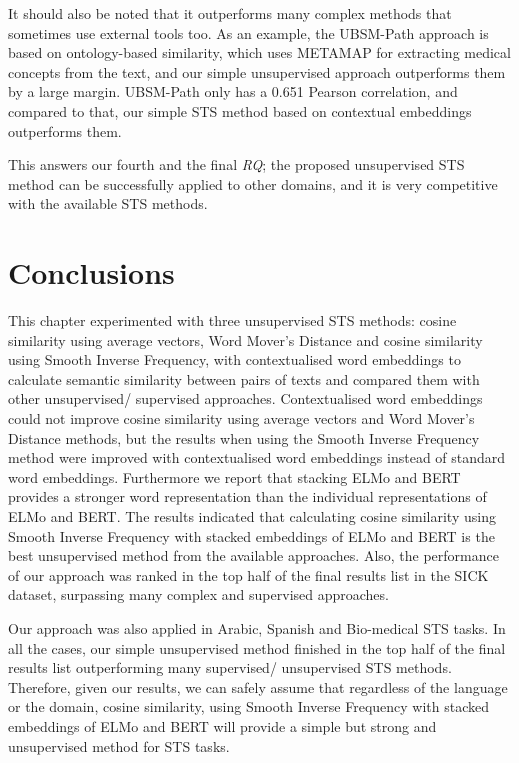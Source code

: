 It should also be noted that it outperforms many complex methods that sometimes use external tools too. As an example, the UBSM-Path approach is based on ontology-based similarity, which uses METAMAP \autocite{Aronson2001} for extracting medical concepts from the text, and our simple unsupervised approach outperforms them by a large margin. UBSM-Path only has a 0.651 Pearson correlation, and compared to that, our simple STS method based on contextual embeddings outperforms them. 

This answers our fourth and the final \textit{RQ}; the proposed unsupervised STS method can be successfully applied to other domains, and it is very competitive with the available STS methods. 



\section{Conclusions}
\label{sec:state_conclusions}

This chapter experimented with three unsupervised STS methods: cosine similarity using average vectors, Word Mover's Distance and cosine similarity using Smooth Inverse Frequency, with contextualised word embeddings to calculate semantic similarity between pairs of texts and compared them with other unsupervised/ supervised approaches. Contextualised word embeddings could not improve cosine similarity using average vectors and Word Mover's Distance methods, but the results when using the Smooth Inverse Frequency method were improved with contextualised word embeddings instead of standard word embeddings. Furthermore we report that stacking ELMo and BERT provides a stronger word representation than the individual representations of ELMo and BERT. The results indicated that calculating cosine similarity using Smooth Inverse Frequency with stacked embeddings of ELMo and BERT is the best unsupervised method from the available approaches. Also, the performance of our approach was ranked in the top half of the final results list in the SICK dataset, surpassing many complex and supervised approaches. 


Our approach was also applied in Arabic, Spanish and Bio-medical STS tasks. In all the cases, our simple unsupervised method finished in the top half of the final results list outperforming many supervised/ unsupervised STS methods. Therefore, given our results, we can safely assume that regardless of the language or the domain, cosine similarity, using Smooth Inverse Frequency with stacked embeddings of ELMo and BERT will provide a simple but strong and unsupervised method for STS tasks. 

